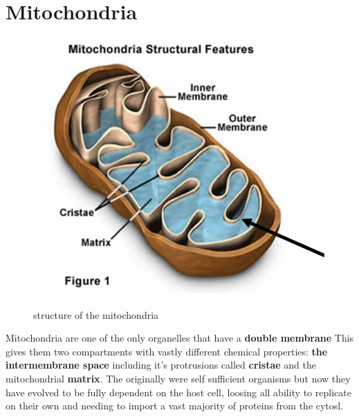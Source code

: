 \documentclass[../main.tex]{subfiles}
\begin{document}
\section{Mitochondria}
\begin{figure}[H]
    \centering
    \includegraphics[width=0.5\linewidth]{mitochondria1.png}
    \caption{structure of the mitochondria}
    \label{fig:enter-label}
\end{figure}
Mitochondria are one of the only organelles that have a \textbf{double membrane} This gives them two compartments with vastly different chemical properties: \textbf{the intermembrane space} including it's protrusions called \textbf{\gls{cristae}} and the mitochondrial \textbf{matrix}. The originally were self sufficient organisms but now they have evolved to be fully dependent on the host cell, loosing all ability to replicate on their own and needing to import a vast majority of proteins from the cytosl.
\end{document}
